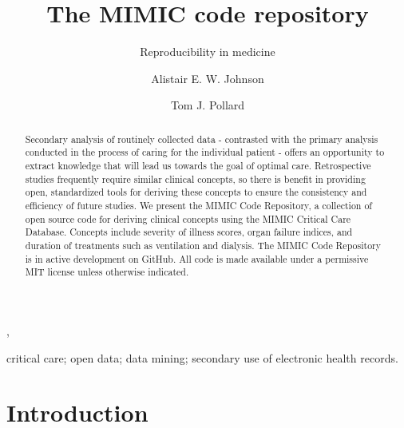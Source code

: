 \documentclass{elsart}
\begin{document}
\begin{frontmatter}
\title{The MIMIC code repository}
\subtitle{Reproducibility in medicine}

\author[Cambridge]{Alistair E. W. Johnson},
\author[Cambridge]{Tom J. Pollard}
\address[Cambridge]{Massachusetts Institute of Technology, Cambridge}


\begin{keyword}
critical care; open data; data mining; secondary use of electronic health records.
\end{keyword}


\begin{abstract}
Secondary analysis of routinely collected data - contrasted with the primary analysis conducted in the process of caring for the individual patient - offers an opportunity to extract knowledge that will lead us towards the goal of optimal care. Retrospective studies frequently require similar clinical concepts, so there is benefit in providing open, standardized tools for deriving these concepts to ensure the consistency and efficiency of future studies. We present the MIMIC Code Repository, a collection of open source code for deriving clinical concepts using the MIMIC Critical Care Database. Concepts include severity of illness scores, organ failure indices, and duration of treatments such as ventilation and dialysis. The MIMIC Code Repository is in active development on GitHub. All code is made available under a permissive MIT license unless otherwise indicated.\\
\end{abstract}

\end{frontmatter}


\section{Introduction}

\end{document}
